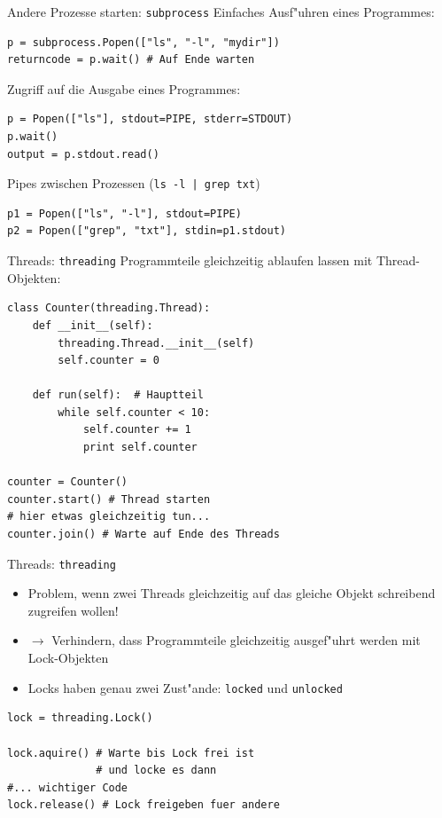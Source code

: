 \begin{frame}[fragile]{Andere Prozesse starten: \texttt{subprocess}}
Einfaches Ausf"uhren eines Programmes:
\begin{lstlisting}[style=Python]
p = subprocess.Popen(["ls", "-l", "mydir"])
returncode = p.wait() # Auf Ende warten
\end{lstlisting}
Zugriff auf die Ausgabe eines Programmes:
\begin{lstlisting}[style=Python]
p = Popen(["ls"], stdout=PIPE, stderr=STDOUT) 
p.wait()
output = p.stdout.read()
\end{lstlisting}
Pipes zwischen Prozessen (\lstinline{ls -l | grep txt})
\begin{lstlisting}[style=Python]
p1 = Popen(["ls", "-l"], stdout=PIPE)
p2 = Popen(["grep", "txt"], stdin=p1.stdout)
\end{lstlisting}
\end{frame}

\begin{frame}[fragile]{Threads: \texttt{threading}}
Programmteile gleichzeitig ablaufen lassen mit \alert{Thread-Objekten}:
\begin{lstlisting}[style=Python]
class Counter(threading.Thread):
    def __init__(self):
        threading.Thread.__init__(self)
        self.counter = 0

    def run(self):  # Hauptteil
        while self.counter < 10:
            self.counter += 1
            print self.counter

counter = Counter()
counter.start() # Thread starten
# hier etwas gleichzeitig tun...
counter.join() # Warte auf Ende des Threads
\end{lstlisting}
\end{frame}

\begin{frame}[fragile]{Threads: \texttt{threading}}
\begin{itemize}
\item Problem, wenn zwei Threads gleichzeitig auf das gleiche Objekt schreibend zugreifen wollen!
\item $\rightarrow$ Verhindern, dass Programmteile gleichzeitig ausgef"uhrt werden mit \alert{Lock-Objekten}
\item Locks haben genau zwei Zust"ande: \texttt{locked} und \texttt{unlocked}
\end{itemize}
\begin{lstlisting}[style=Python]
lock = threading.Lock()

lock.aquire() # Warte bis Lock frei ist
              # und locke es dann 
#... wichtiger Code
lock.release() # Lock freigeben fuer andere
\end{lstlisting}
\end{frame}

